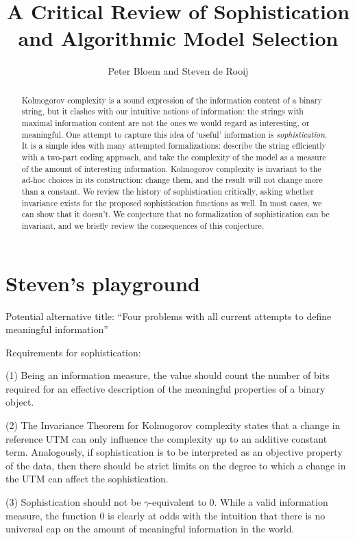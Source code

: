 \documentclass{style/llncs}
\title{A Critical Review of Sophistication and Algorithmic Model Selection}
\author{Peter Bloem and Steven de Rooij}
\institute{
  System and Network Engineering Group, \\University of Amsterdam, the Netherlands\\
  \email{uva@peterbloem.nl, steven.de.rooij@gmail.com}
}
\begin{document}
\maketitle

\begin{abstract}
Kolmogorov complexity is a sound expression of the information content of a binary string, but it clashes with our intuitive notions of information: the strings with maximal information content are not the ones we would regard as interesting, or meaningful. One attempt to capture this idea of `useful' information is \emph{sophistication}. It is a simple idea with many attempted formalizations: describe the string efficiently with a two-part coding approach, and take the complexity of the model as a measure of the amount of interesting information. Kolmogorov complexity is invariant to the ad-hoc choices in its construction: change them, and the result will not change more than a constant. We review the history of sophistication critically, asking whether invariance exists for the proposed sophistication functions as well. In most cases, we can show that it doesn't. We conjecture that no formalization of sophistication can be invariant, and we briefly review the consequences of this conjecture.
\end{abstract}

\section{Steven's playground}

Potential alternative title: ``Four problems with all current attempts to define meaningful information''

Requirements for sophistication:

(1) Being an information measure, the value should count the number of bits required for an effective description of the meaningful properties of a binary object.

(2) The Invariance Theorem for Kolmogorov complexity states that a change in reference UTM can only influence the complexity up to an additive constant term. Analogously, if sophistication is to be interpreted as an objective property of the data, then there should be strict limits on the degree to which a change in the UTM can affect the sophistication.

(3) Sophistication should not be $\gamma$-equivalent to 0. While a valid information measure, the function 0 is clearly at odds with the intuition that there is no universal cap on the amount of meaningful information in the world.
\end{document}
